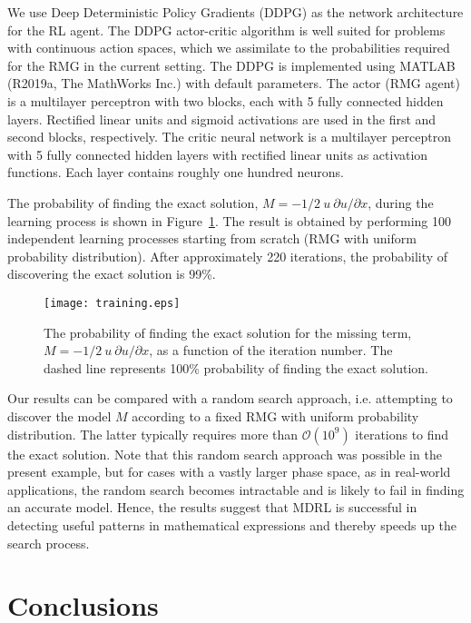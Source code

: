 \documentclass{article}
\begin{document}
We use Deep Deterministic Policy Gradients (DDPG)
\citep{Lillicrap2015} as the network architecture for the RL
agent. The DDPG actor-critic algorithm is well suited for problems
with continuous action spaces, which we assimilate to the
probabilities required for the RMG in the current setting. The DDPG is
implemented using MATLAB (R2019a, The MathWorks Inc.) with default
parameters. The actor (RMG agent) is a multilayer perceptron with two
blocks, each with 5 fully connected hidden layers. Rectified linear
units and sigmoid activations are used in the first and second blocks,
respectively. The critic neural network is a multilayer perceptron
with 5 fully connected hidden layers with rectified linear units as
activation functions. Each layer contains roughly one hundred neurons.

The probability of finding the exact solution, $M=-1/2 \ u \ \partial
u/\partial x$, during the learning process is shown in
Figure~\ref{fig:training}. The result is obtained by performing 100
independent learning processes starting from scratch (RMG with uniform
probability distribution). After approximately 220 iterations, the
probability of discovering the exact solution is 99\%.
\begin{figure}
    \centering
    \texttt{[image: training.eps]}
    \caption{The probability of finding the exact solution for the
      missing term, $M=-1/2 \ u \ \partial u/\partial x$, as a
      function of the iteration number. The dashed line represents
      100\% probability of finding the exact
      solution. \label{fig:training}}
\end{figure}
Our results can be compared with a random search approach, i.e. attempting to discover the model $M$ according to a fixed RMG with uniform probability distribution. The
latter typically requires more than $\mathcal{O}(10^9)$ iterations to find the
exact solution. Note that this random search approach was possible in the present example, but for cases with a vastly larger phase space, as in real-world applications, the random search becomes intractable and is likely to fail in finding an accurate model.  Hence, the results suggest that
MDRL is successful in detecting useful patterns in mathematical expressions and thereby speeds up the search process.

\section{Conclusions}
\label{sec:conclusions}
\end{document}
